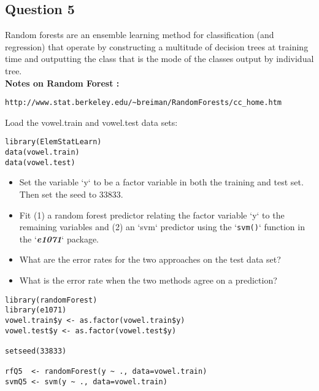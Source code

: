 \documentclass[12pt]{article}
\begin{document}
\subsection*{Question 5}
Random forests are an ensemble learning method for classification (and regression) that operate by constructing a multitude of decision trees at training time and outputting the class that is the mode of the classes output by individual tree.\\
\textbf{Notes on Random Forest :}
\begin{verbatim}
http://www.stat.berkeley.edu/~breiman/RandomForests/cc_home.htm
\end{verbatim}

Load the vowel.train and vowel.test data sets:

\begin{framed}
\begin{verbatim}
library(ElemStatLearn)
data(vowel.train)
data(vowel.test)
\end{verbatim}
\end{framed}
\begin{itemize}
\item Set the variable `y` to be a factor variable in both the training and test set.
Then set the seed to 33833. \item Fit (1) a random forest predictor relating the
factor variable `y` to the remaining variables and (2) an `svm` predictor using
the `\texttt{svm()}` function in the `\textit{\textbf{e1071}}` package. \item What are the error rates for the
two approaches on the test data set? \item What is the error rate when the two methods
agree on a prediction?
\end{itemize}
\begin{framed}
\begin{verbatim}
library(randomForest)
library(e1071)
vowel.train$y <- as.factor(vowel.train$y)
vowel.test$y <- as.factor(vowel.test$y)

setseed(33833)

rfQ5  <- randomForest(y ~ ., data=vowel.train)
svmQ5 <- svm(y ~ ., data=vowel.train)
\end{verbatim}
\end{framed}

\end{document}
